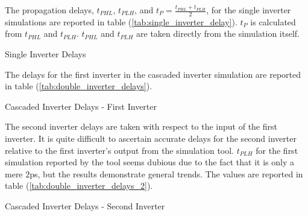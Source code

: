 \FloatBarrier

The propagation delays, $t_{PHL}$, $t_{PLH}$, and $t_{P} = \frac{ t_{PHL} + t_{PLH} }{2}$, for the single inverter simulations are reported in table (\ref{tab:single_inverter_delay}).
$t_{P}$ is calculated from $t_{PHL}$ and $t_{PLH}$.
$t_{PHL}$ and $t_{PLH}$ are taken directly from the simulation itself.

\FloatBarrier

\begin{table}[h!]
	\centering
	\caption{Single Inverter Delays}
	\label{tab:single_inverter_delay}
\end{table}

\FloatBarrier

The delays for the first inverter in the cascaded inverter simulation are reported in table (\ref{tab:double_inverter_delays}).

\FloatBarrier

\begin{table}[h!]
	\centering
	\caption{Cascaded Inverter Delays - First Inverter}
	\label{tab:double_inverter_delays}
\end{table}

\FloatBarrier

The second inverter delays are taken with respect to the input of the first inverter.
It is quite difficult to ascertain accurate delays for the second inverter relative to the first inverter's output from the simulation tool.
$t_{PLH}$ for the first simulation reported by the tool seems dubious due to the fact that it is only a mere $2$\si{\pico\second}, but the results demonstrate general trends.
The values are reported in table (\ref{tab:double_inverter_delays_2}).

\FloatBarrier

\begin{table}[h!]
	\centering
	\caption{Cascaded Inverter Delays - Second Inverter}
	\label{tab:double_inverter_delays_2}
\end{table}

\FloatBarrier

